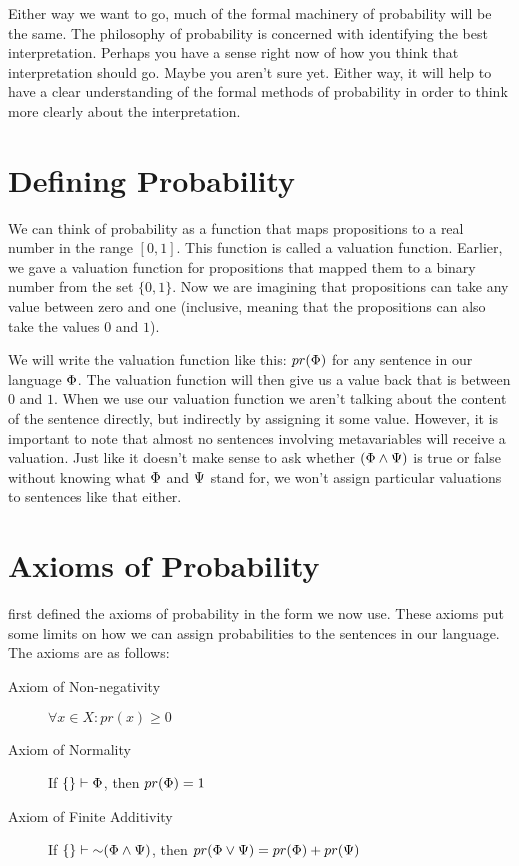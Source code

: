 Either way we want to go, much of the formal machinery of probability will be the same. The philosophy of probability is concerned with identifying the best interpretation. Perhaps you have a sense right now of how you think that interpretation should go. Maybe you aren't sure yet. Either way, it will help to have a clear understanding of the formal methods of probability in order to think more clearly about the interpretation.

\section{Defining Probability}

We can think of probability as a function that maps propositions to a real number in the range $[0,1]$. This function is called a valuation function. Earlier, we gave a valuation function for propositions that mapped them to a binary number from the set $\{0,1\}$. Now we are imagining that propositions can take any value between zero and one (inclusive, meaning that the propositions can also take the values $0$ and $1$).

We will write the valuation function like this: $pr(\Phi)$ for any sentence in our language $\Phi$. The valuation function will then give us a value back that is between $0$ and $1$. When we use our valuation function we aren't talking about the content of the sentence directly, but indirectly by assigning it some value. However, it is important to note that almost no sentences involving metavariables will receive a valuation. Just like it doesn't make sense to ask whether $(\Phi\land\Psi)$ is true or false without knowing what $\Phi$ and $\Psi$ stand for, we won't assign particular valuations to sentences like that either.

\section{Axioms of Probability}\label{sec:axiomsofprobability}

\citet{kolmogorov1933} first defined the axioms of probability in the form we now use. These axioms put some limits on how we can assign probabilities to the sentences in our language. The axioms are as follows:

\begin{description}
  \item[Axiom of Non-negativity] $\forall x \in X : pr(x) \ge 0$
  \item[Axiom of Normality] If $\{\}\vdash\Phi$, then $pr(\Phi)=1$
  \item[Axiom of Finite Additivity] If $\{\}\vdash\mathord{\sim}(\Phi\land\Psi)$, then $pr(\Phi\lor\Psi)=pr(\Phi)+pr(\Psi)$
\end{description}
